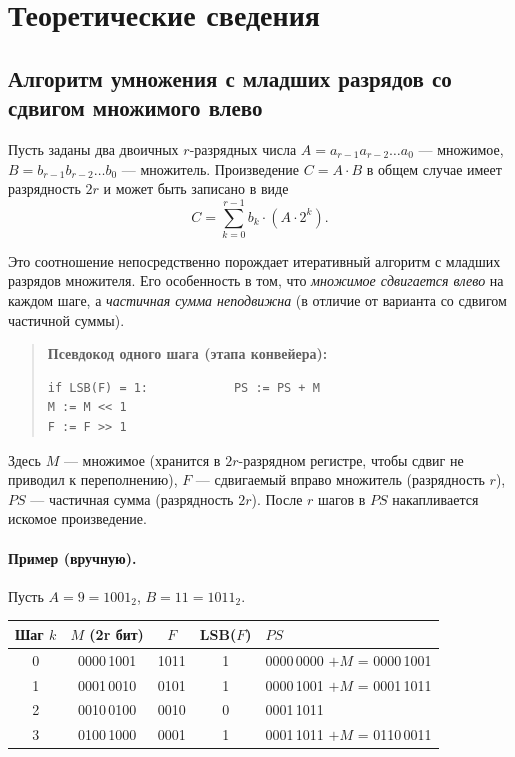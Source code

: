 \documentclass[12pt,a4paper]{article}
\begin{document}
\section{Теоретические сведения}

\subsection{Алгоритм умножения с младших разрядов со сдвигом
множимого влево}

Пусть заданы два двоичных $r$-разрядных числа
$A = a_{r-1} a_{r-2} \ldots a_0$ — множимое,
$B = b_{r-1} b_{r-2} \ldots b_0$ — множитель.
Произведение $C = A \cdot B$ в общем случае имеет разрядность $2r$
и может быть записано в виде
\[
  C = \sum_{k=0}^{r-1} b_k \cdot (A \cdot 2^{k}).
\]

Это соотношение непосредственно порождает итеративный алгоритм
с младших разрядов множителя. Его особенность в том, что
\emph{множимое сдвигается влево} на каждом шаге, а \emph{частичная
сумма неподвижна} (в отличие от варианта со сдвигом частичной суммы).

\begin{quote}
\textbf{Псевдокод одного шага (этапа конвейера):}
\begin{verbatim}
if LSB(F) = 1:            PS := PS + M
M := M << 1
F := F >> 1
\end{verbatim}
\end{quote}

Здесь $M$ — множимое (хранится в $2r$-разрядном регистре, чтобы
сдвиг не приводил к переполнению), $F$ — сдвигаемый вправо
множитель (разрядность $r$), $PS$ — частичная сумма (разрядность $2r$).
После $r$ шагов в $PS$ накапливается искомое произведение.

\paragraph{Пример (вручную).} Пусть $A = 9 = 1001_2$, $B = 11 = 1011_2$.

\begin{center}
\begin{tabular}{c|c|c|c|l}
\toprule
Шаг $k$ & $M$ (2r бит) & $F$ & LSB($F$) & $PS$ \\
\midrule
0 & 0000\,1001 & 1011 & 1 & 0000\,0000 $+ M$ = 0000\,1001 \\
1 & 0001\,0010 & 0101 & 1 & 0000\,1001 $+ M$ = 0001\,1011 \\
2 & 0010\,0100 & 0010 & 0 & 0001\,1011 \\
3 & 0100\,1000 & 0001 & 1 & 0001\,1011 $+ M$ = 0110\,0011 \\
\bottomrule
\end{tabular}
\end{center}
\end{document}
